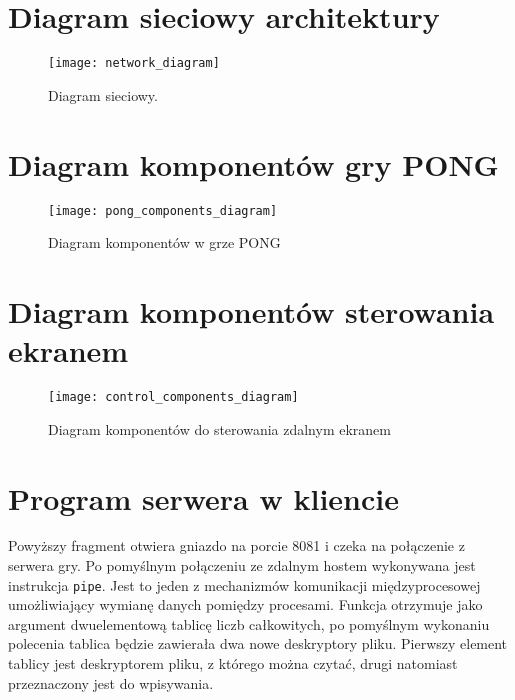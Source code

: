 \newpage
\begin{appendices}

\newpage
\section{Diagram sieciowy architektury}
\label{app:network_diagram_app}
\begin{figure}[H]
\begin{center}
    \texttt{[image: network\_diagram]}
\end{center}
\caption{Diagram sieciowy.}
\label{fig:network_diagram1}
\end{figure}



\newpage
\section{Diagram komponentów gry PONG}
\label{app:pong_comp_diagram}
\begin{figure}[H]
\begin{center}
    \texttt{[image: pong\_components\_diagram]}
\end{center}
\caption{Diagram komponentów w grze PONG}
\end{figure}



\newpage
\section{Diagram komponentów sterowania ekranem}
\label{app:control_comp_diagram}
\begin{figure}[H]
\begin{center}
    \texttt{[image: control\_components\_diagram]}
\end{center}
\caption{Diagram komponentów do sterowania zdalnym ekranem}
\end{figure}




\newpage
\section{Program serwera w kliencie}
\label{app:server_c}


Powyższy fragment otwiera gniazdo na porcie 8081 i czeka na połączenie z serwera gry. Po pomyślnym połączeniu ze zdalnym hostem wykonywana jest instrukcja \lstinline{pipe}. Jest to jeden z mechanizmów komunikacji międzyprocesowej umożliwiający wymianę danych pomiędzy procesami. Funkcja otrzymuje jako argument dwuelementową tablicę liczb całkowitych, po pomyślnym wykonaniu polecenia tablica będzie zawierała dwa nowe deskryptory pliku. Pierwszy element tablicy jest deskryptorem pliku, z którego można czytać, drugi natomiast przeznaczony jest do wpisywania.


\end{appendices}

